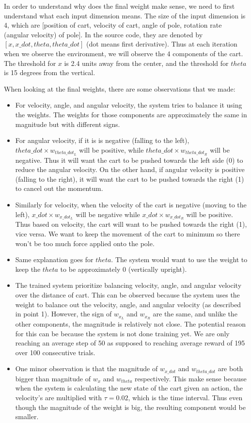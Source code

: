 \documentclass[11pt,twoside]{article}
\begin{document}
In order to understand why does the final weight make sense, we need to first understand what each input dimension means. The size of the input dimension is 4, which are [position of cart, velocity of cart, angle of pole, rotation rate (angular velocity) of pole]. In the source code, they are denoted by $[x, x\_dot, theta, theta\_dot]$ (dot means first derivative). Thus at each iteration when we observe the environment, we will observe the 4 components of the cart. The threshold for $x$ is 2.4 units away from the center, and the threshold for $theta$ is 15 degrees from the vertical.

When looking at the final weights, there are some observations that we made:
\begin {itemize}
	\item For velocity, angle, and angular velocity, the system tries to balance it using the weights. The weights for those components are approximately the same in magnitude but with different signs.
	\item For angular velocity, if it is is negative (falling to the left), $theta\_dot \times w_{theta\_dot_L}$ will be positive, while $theta\_dot \times w_{theta\_dot_R}$ will be negative. Thus it will want the cart to be pushed towards the left side (0) to reduce the angular velocity. On the other hand, if angular velocity is positive (falling to the right), it will want the cart to be pushed towards the right (1) to cancel out the momentum.
	\item Similarly for velocity, when the velocity of the cart is negative (moving to the left), $x\_dot \times w_{x\_dot_L}$ will be negative while $x\_dot \times w_{x\_dot_R}$ will be positive. Thus based on velocity, the cart will want to be pushed towards the right (1), vice versa. We want to keep the movement of the cart to minimum so there won't be too much force applied onto the pole.
	\item Same explanation goes for $theta$. The system would want to use the weight to keep the $theta$ to be approximately 0 (vertically upright).
	\item The trained system prioritize balancing velocity, angle, and angular velocity over the distance of cart. This can be observed because the system uses the weight to balance out the velocity, angle, and angular velocity (as described in point 1). However, the sign of $w_{x_L}$ and $w_{x_R}$ are the same, and unlike the other components, the magnitude is relatively not close. The potential reason for this can be because the system is not done training yet. We are only reaching an average step of 50 as supposed to reaching average reward of 195 over 100 consecutive trials.
	\item One minor observation is that the magnitude of $w_{x\_dot}$ and $w_{theta\_dot}$ are both bigger than magnitude of $w_x$ and $w_{theta}$ respectively. This make sense because when the system is calculating the new state of the cart given an action, the velocity's are multiplied with $\tau=0.02$, which is the time interval. Thus even though the magnitude of the weight is big, the resulting component would be smaller.
\end {itemize}

\clearpage
\end{document}
